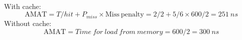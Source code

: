 \begin{questions}
{


    \begin{solution}
        \\
        With cache:\\
        $$
            \mathrm{AMAT}=T/hit+P_{miss}\times \mathrm{Miss\ penalty}
            =2/2+5/6 \times 600/2=251\ ns
        $$
        Without cache:\\
        $$
            \mathrm{AMAT}=Time\ for\ load\ from\ memory
            =600/2=300\ ns
        $$
        \vspace{2in}
    \end{solution}
}

\end{questions}
